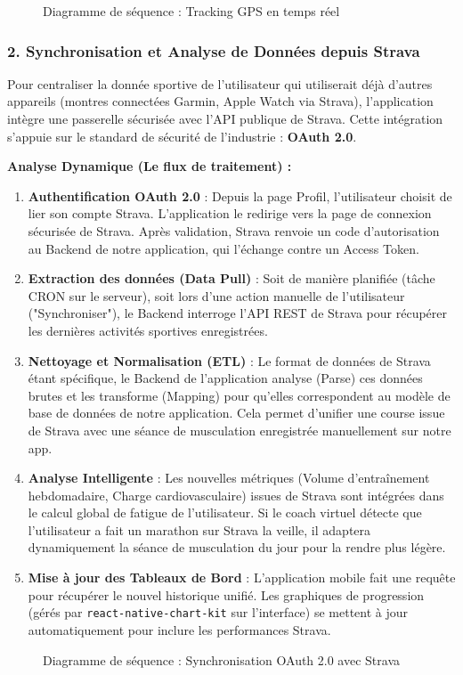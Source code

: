 \begin{figure}[H]
    \centering
\caption{Diagramme de séquence : Tracking GPS en temps réel}
\end{figure}

\subsubsection{2. Synchronisation et Analyse de Données depuis Strava}
Pour centraliser la donnée sportive de l'utilisateur qui utiliserait déjà d'autres appareils (montres connectées Garmin, Apple Watch via Strava), l'application intègre une passerelle sécurisée avec l'API publique de Strava. Cette intégration s'appuie sur le standard de sécurité de l'industrie : \textbf{OAuth 2.0}.

\textbf{Analyse Dynamique (Le flux de traitement) :}
\begin{enumerate}
    \item \textbf{Authentification OAuth 2.0} : Depuis la page Profil, l'utilisateur choisit de lier son compte Strava. L'application le redirige vers la page de connexion sécurisée de Strava. Après validation, Strava renvoie un code d'autorisation au Backend de notre application, qui l'échange contre un Access Token.
    \item \textbf{Extraction des données (Data Pull)} : Soit de manière planifiée (tâche CRON sur le serveur), soit lors d'une action manuelle de l'utilisateur ("Synchroniser"), le Backend interroge l'API REST de Strava pour récupérer les dernières activités sportives enregistrées.
    \item \textbf{Nettoyage et Normalisation (ETL)} : Le format de données de Strava étant spécifique, le Backend de l'application analyse (Parse) ces données brutes et les transforme (Mapping) pour qu'elles correspondent au modèle de base de données de notre application. Cela permet d'unifier une course issue de Strava avec une séance de musculation enregistrée manuellement sur notre app.
    \item \textbf{Analyse Intelligente} : Les nouvelles métriques (Volume d'entraînement hebdomadaire, Charge cardiovasculaire) issues de Strava sont intégrées dans le calcul global de fatigue de l'utilisateur. Si le coach virtuel détecte que l'utilisateur a fait un marathon sur Strava la veille, il adaptera dynamiquement la séance de musculation du jour pour la rendre plus légère.
    \item \textbf{Mise à jour des Tableaux de Bord} : L'application mobile fait une requête pour récupérer le nouvel historique unifié. Les graphiques de progression (gérés par \texttt{react-native-chart-kit} sur l'interface) se mettent à jour automatiquement pour inclure les performances Strava.
\end{enumerate}

\begin{figure}[H]
    \centering
\caption{Diagramme de séquence : Synchronisation OAuth 2.0 avec Strava}
\end{figure}
